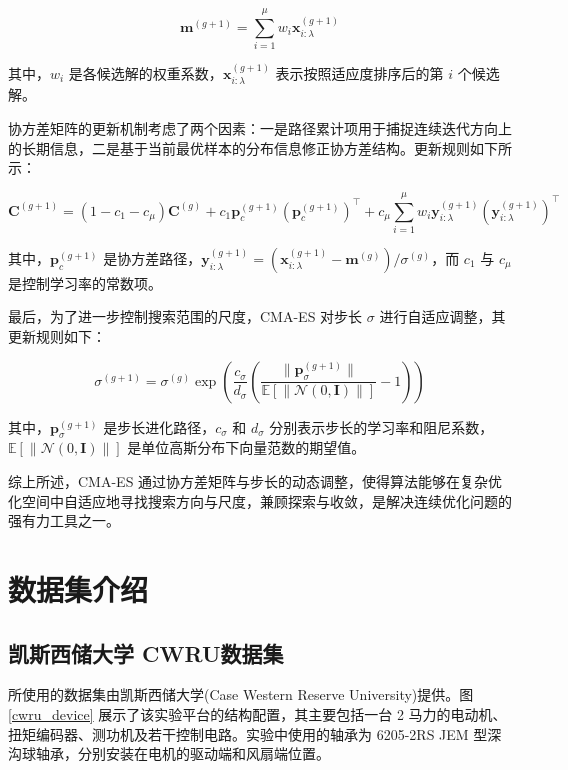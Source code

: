 \documentclass[master]{thesis-uestc}
\begin{document}
\begin{equation}
\mathbf{m}^{(g+1)} = \sum_{i=1}^{\mu} w_i \mathbf{x}_{i:\lambda}^{(g+1)}
\label{eq:mean_update}
\end{equation}

其中，\(w_i\) 是各候选解的权重系数，\(\mathbf{x}_{i:\lambda}^{(g+1)}\) 表示按照适应度排序后的第 \(i\) 个候选解。

协方差矩阵的更新机制考虑了两个因素：一是路径累计项用于捕捉连续迭代方向上的长期信息，二是基于当前最优样本的分布信息修正协方差结构。更新规则如下所示：

\begin{equation}
\mathbf{C}^{(g+1)} = (1 - c_1 - c_\mu) \mathbf{C}^{(g)} + c_1 \mathbf{p}_c^{(g+1)} (\mathbf{p}_c^{(g+1)})^\top + c_\mu \sum_{i=1}^{\mu} w_i \mathbf{y}_{i:\lambda}^{(g+1)} (\mathbf{y}_{i:\lambda}^{(g+1)})^\top
\label{eq:covariance_update}
\end{equation}

其中，\(\mathbf{p}_c^{(g+1)}\) 是协方差路径，\(\mathbf{y}_{i:\lambda}^{(g+1)} = (\mathbf{x}_{i:\lambda}^{(g+1)} - \mathbf{m}^{(g)}) / \sigma^{(g)}\)，而 \(c_1\) 与 \(c_\mu\) 是控制学习率的常数项。

最后，为了进一步控制搜索范围的尺度，CMA-ES 对步长 \(\sigma\) 进行自适应调整，其更新规则如下：

\begin{equation}
\sigma^{(g+1)} = \sigma^{(g)} \exp\left(\frac{c_\sigma}{d_\sigma} \left(\frac{\|\mathbf{p}_\sigma^{(g+1)}\|}{\mathbb{E}[\|\mathcal{N}(0, \mathbf{I})\|]} - 1\right)\right)
\label{eq:stepsize_update}
\end{equation}

其中，\(\mathbf{p}_\sigma^{(g+1)}\) 是步长进化路径，\(c_\sigma\) 和 \(d_\sigma\) 分别表示步长的学习率和阻尼系数，\(\mathbb{E}[\|\mathcal{N}(0, \mathbf{I})\|]\) 是单位高斯分布下向量范数的期望值。

综上所述，CMA-ES 通过协方差矩阵与步长的动态调整，使得算法能够在复杂优化空间中自适应地寻找搜索方向与尺度，兼顾探索与收敛，是解决连续优化问题的强有力工具之一。

\FloatBarrier  %


\section{数据集介绍}
\subsection{凯斯西储大学 CWRU数据集}
所使用的数据集由凯斯西储大学(Case Western Reserve University)提供。图 \ref{cwru_device} 展示了该实验平台的结构配置，其主要包括一台 2 马力的电动机、扭矩编码器、测功机及若干控制电路。实验中使用的轴承为 6205-2RS JEM 型深沟球轴承，分别安装在电机的驱动端和风扇端位置。
\end{document}
